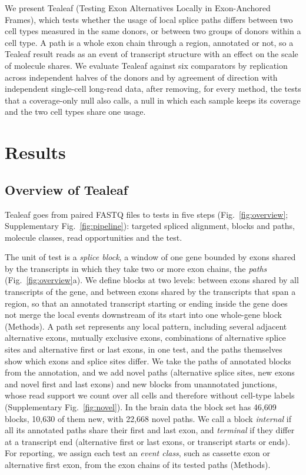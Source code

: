 \documentclass[11pt]{article}
\begin{document}
We present Tealeaf (Testing Exon Alternatives Locally in Exon-Anchored Frames), which tests whether the usage of local splice paths differs between two cell types measured in the same donors, or between two groups of donors within a cell type. A path is a whole exon chain through a region, annotated or not, so a Tealeaf result reads as an event of transcript structure with an effect on the scale of molecule shares. We evaluate Tealeaf against six comparators by replication across independent halves of the donors and by agreement of direction with independent single-cell long-read data, after removing, for every method, the tests that a coverage-only null also calls, a null in which each sample keeps its coverage and the two cell types share one usage.

\section{Results}

\subsection{Overview of Tealeaf}

Tealeaf goes from paired FASTQ files to tests in five steps (Fig.~\ref{fig:overview}; Supplementary Fig.~\ref{fig:pipeline}): targeted spliced alignment, blocks and paths, molecule classes, read opportunities and the test.

The unit of test is a \emph{splice block}, a window of one gene bounded by exons shared by the transcripts in which they take two or more exon chains, the \emph{paths} (Fig.~\ref{fig:overview}a). We define blocks at two levels: between exons shared by all transcripts of the gene, and between exons shared by the transcripts that span a region, so that an annotated transcript starting or ending inside the gene does not merge the local events downstream of its start into one whole-gene block (Methods). A path set represents any local pattern, including several adjacent alternative exons, mutually exclusive exons, combinations of alternative splice sites and alternative first or last exons, in one test, and the paths themselves show which exons and splice sites differ. We take the paths of annotated blocks from the annotation, and we add novel paths (alternative splice sites, new exons and novel first and last exons) and new blocks from unannotated junctions, whose read support we count over all cells and therefore without cell-type labels (Supplementary Fig.~\ref{fig:novel}). In the brain data the block set has 46{,}609 blocks, 10{,}630 of them new, with 22{,}668 novel paths. We call a block \emph{internal} if all its annotated paths share their first and last exon, and \emph{terminal} if they differ at a transcript end (alternative first or last exons, or transcript starts or ends). For reporting, we assign each test an \emph{event class}, such as cassette exon or alternative first exon, from the exon chains of its tested paths (Methods).
\end{document}
